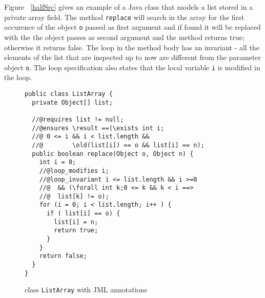Figure ~\ref{halfSrc} gives an example of a Java class that models a list stored in a private array field. 
The method \texttt{replace} will search in the array for the first occurence of the object \texttt{o} passed as first argument and if found it will be replaced with the 
the object passes as second argument and the method returns true; otherwise it returns false. The loop in the method body has an invariant - all
the elements of the list that are inspected up to now are different from the parameter object \texttt{o}. The loop specification also states
that the local variable \texttt{i} is modified in the loop.
\begin{figure}[ht!]
\begin{verbatim}
public class ListArray {
  private Object[] list;

  //@requires list != null;
  //@ensures \result ==(\exists int i; 
  //@ 0 <= i && i < list.length && 
  //@        \old(list[i]) == o && list[i] == n); 
  public boolean replace(Object o, Object n) {
    int i = 0;
    //@loop_modifies i;
    //@loop_invariant i <= list.length && i >=0 
    //@  && (\forall int k;0 <= k && k < i ==> 
    //@  list[k] != o); 
    for (i = 0; i < list.length; i++ ) {
      if ( list[i] == o) {
        list[i] = n;
        return true;	
      }
    }
    return false;
  }
}
\end{verbatim}
\caption{class \texttt{ListArray} with JML annotations} 
\label{replaceSrc}
\end{figure}


